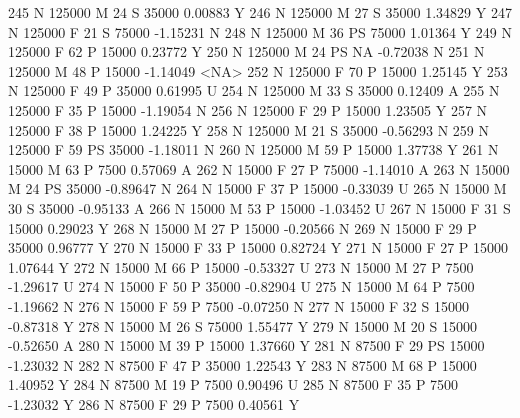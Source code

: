 \documentclass{article}
\begin{document}
\begin{Schunk}
\begin{Soutput}
245       N     125000   M  24         S  35000   0.00883    Y
246       N     125000   M  27         S  35000   1.34829    Y
247       N     125000   F  21         S  75000  -1.15231    N
248       N     125000   M  36        PS  75000   1.01364    Y
249       N     125000   F  62         P  15000   0.23772    Y
250       N     125000   M  24        PS     NA  -0.72038    N
251       N     125000   M  48         P  15000  -1.14049 <NA>
252       N     125000   F  70         P  15000   1.25145    Y
253       N     125000   F  49         P  35000   0.61995    U
254       N     125000   M  33         S  35000   0.12409    A
255       N     125000   F  35         P  15000  -1.19054    N
256       N     125000   F  29         P  15000   1.23505    Y
257       N     125000   F  38         P  15000   1.24225    Y
258       N     125000   M  21         S  35000  -0.56293    N
259       N     125000   F  59        PS  35000  -1.18011    N
260       N     125000   M  59         P  15000   1.37738    Y
261       N      15000   M  63         P   7500   0.57069    A
262       N      15000   F  27         P  75000  -1.14010    A
263       N      15000   M  24        PS  35000  -0.89647    N
264       N      15000   F  37         P  15000  -0.33039    U
265       N      15000   M  30         S  35000  -0.95133    A
266       N      15000   M  53         P  15000  -1.03452    U
267       N      15000   F  31         S  15000   0.29023    Y
268       N      15000   M  27         P  15000  -0.20566    N
269       N      15000   F  29         P  35000   0.96777    Y
270       N      15000   F  33         P  15000   0.82724    Y
271       N      15000   F  27         P  15000   1.07644    Y
272       N      15000   M  66         P  15000  -0.53327    U
273       N      15000   M  27         P   7500  -1.29617    U
274       N      15000   F  50         P  35000  -0.82904    U
275       N      15000   M  64         P   7500  -1.19662    N
276       N      15000   F  59         P   7500  -0.07250    N
277       N      15000   F  32         S  15000  -0.87318    Y
278       N      15000   M  26         S  75000   1.55477    Y
279       N      15000   M  20         S  15000  -0.52650    A
280       N      15000   M  39         P  15000   1.37660    Y
281       N      87500   F  29        PS  15000  -1.23032    N
282       N      87500   F  47         P  35000   1.22543    Y
283       N      87500   M  68         P  15000   1.40952    Y
284       N      87500   M  19         P   7500   0.90496    U
285       N      87500   F  35         P   7500  -1.23032    Y
286       N      87500   F  29         P   7500   0.40561    Y

\end{Soutput}
\end{Schunk}
\end{document}
